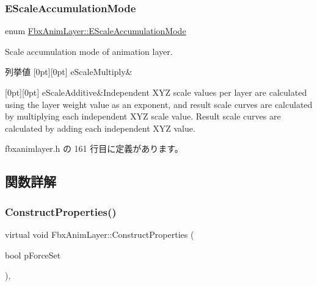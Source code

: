 \subsubsection{\texorpdfstring{E\+Scale\+Accumulation\+Mode}{EScaleAccumulationMode}}
{\footnotesize\ttfamily enum \hyperlink{class_fbx_anim_layer_aec9cfaa528bee6739ba4317964d123b0}{Fbx\+Anim\+Layer\+::\+E\+Scale\+Accumulation\+Mode}}

Scale accumulation mode of animation layer. \begin{DoxyEnumFields}{列挙値}
[0pt][0pt]{}\mbox{\label{class_fbx_anim_layer_aec9cfaa528bee6739ba4317964d123b0af962df864ef1dead2f88ade13f4262d0}} 
e\+Scale\+Multiply&\\
\hline

[0pt][0pt]{}\mbox{\label{class_fbx_anim_layer_aec9cfaa528bee6739ba4317964d123b0a0d79b9c4219c50d434746d7062046123}} 
e\+Scale\+Additive&Independent X\+YZ scale values per layer are calculated using the layer weight value as an exponent, and result scale curves are calculated by multiplying each independent X\+YZ scale value. Result scale curves are calculated by adding each independent X\+YZ value. \\
\hline

\end{DoxyEnumFields}


 fbxanimlayer.\+h の 161 行目に定義があります。



\subsection{関数詳解}
\mbox{\label{class_fbx_anim_layer_a24afc26df98e56c965c0c60e637ed888}} 
\subsubsection{\texorpdfstring{Construct\+Properties()}{ConstructProperties()}}
{\footnotesize\ttfamily virtual void Fbx\+Anim\+Layer\+::\+Construct\+Properties (\begin{DoxyParamCaption}\item[{bool}]{p\+Force\+Set }\end{DoxyParamCaption})\hspace{0.3cm}{\ttfamily [protected]}, {\ttfamily [virtual]}}

